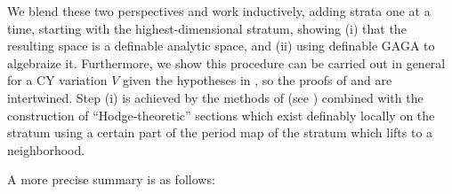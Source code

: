 \documentclass{amsart}
\theoremstyle{definition}
\theoremstyle{remark}
\numberwithin{equation}{section}
\begin{document}
We blend these two perspectives and work inductively, adding strata one at a time, starting with the highest-dimensional stratum, showing (i) that the resulting space is a definable analytic space, and (ii) using definable GAGA \cite{BBT23} to algebraize it.  Furthermore, we show this procedure can be carried out in general for a CY variation $V$ given the hypotheses in , so the proofs of  and  are intertwined.  Step (i) is achieved by the methods of \cite[Theorem 5.4]{BBT23} (see ) combined with the construction of ``Hodge-theoretic'' sections which exist definably locally on the stratum using a certain part of the period map of the stratum which lifts to a neighborhood.   

A more precise summary is as follows:
\end{document}
